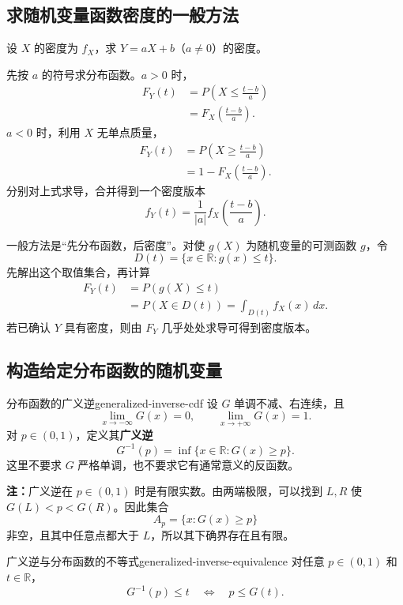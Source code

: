 \subsection*{求随机变量函数密度的一般方法}

\begin{example}[一般连续型随机变量的线性变换]
设 $X$ 的密度为 $f_X$，求 $Y=aX+b$（$a\ne0$）的密度。

先按 $a$ 的符号求分布函数。$a>0$ 时，
\[
\begin{aligned}
F_Y(t)
&=P\left(X\leq\frac{t-b}{a}\right)\\
&=F_X\left(\frac{t-b}{a}\right).
\end{aligned}
\]
$a<0$ 时，利用 $X$ 无单点质量，
\[
\begin{aligned}
F_Y(t)
&=P\left(X\geq\frac{t-b}{a}\right)\\
&=1-F_X\left(\frac{t-b}{a}\right).
\end{aligned}
\]
分别对上式求导，合并得到一个密度版本
\[
\boxed{\quad f_Y(t)=\frac1{|a|}f_X\left(\frac{t-b}{a}\right).\quad}
\]
\end{example}

一般方法是“先分布函数，后密度”。对使 $g(X)$ 为随机变量的可测函数 $g$，令
\[
D(t)=\{x\in\mathbb R:g(x)\leq t\}.
\]
先解出这个取值集合，再计算
\[
\begin{aligned}
F_Y(t)&=P(g(X)\leq t)\\
&=P(X\in D(t))=\int_{D(t)}f_X(x)\,dx.
\end{aligned}
\]
若已确认 $Y$ 具有密度，则由 $F_Y$ 几乎处处求导可得到密度版本。
\subsection*{构造给定分布函数的随机变量}

\begin{mydefinition}{分布函数的广义逆}{generalized-inverse-cdf}
设 $G$ 单调不减、右连续，且
\[
\lim_{x\to-\infty}G(x)=0,\qquad
\lim_{x\to+\infty}G(x)=1.
\]
对 $p\in(0,1)$，定义其\textbf{广义逆}
\[
G^{-1}(p)=\inf\{x\in\mathbb R:G(x)\geq p\}.
\]
这里不要求 $G$ 严格单调，也不要求它有通常意义的反函数。
\end{mydefinition}

\textbf{注：}\quad 广义逆在 $p\in(0,1)$ 时是有限实数。由两端极限，可以找到 $L,R$ 使 $G(L)<p<G(R)$。因此集合
\[
A_p=\{x:G(x)\geq p\}
\]
非空，且其中任意点都大于 $L$，所以其下确界存在且有限。

\begin{mylemma}{广义逆与分布函数的不等式}{generalized-inverse-equivalence}
对任意 $p\in(0,1)$ 和 $t\in\mathbb R$，
\[
G^{-1}(p)\leq t\quad\Longleftrightarrow\quad p\leq G(t).
\]
\end{mylemma}

